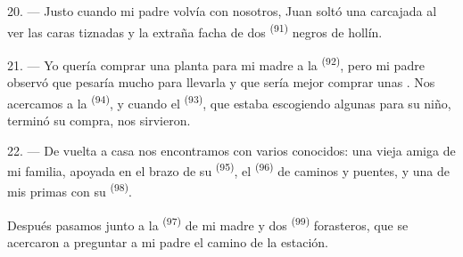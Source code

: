 20. --- Justo cuando mi padre volvía con nosotros, Juan soltó una carcajada
al ver las caras tiznadas y la extraña facha de dos
 \textsuperscript{(91)} negros de hollín.

21. --- Yo quería comprar una planta para mi madre a la 
\textsuperscript{(92)}, pero mi padre observó que pesaría mucho para llevarla y que
sería mejor comprar unas . Nos acercamos a la
 \textsuperscript{(94)}, y cuando el 
\textsuperscript{(93)}, que estaba escogiendo algunas para su niño, terminó su
compra, nos sirvieron.

22. --- De vuelta a casa nos encontramos con varios conocidos: una vieja
amiga de mi familia, apoyada en el brazo de su 
\textsuperscript{(95)}, el  \textsuperscript{(96)} de caminos y puentes, y
una de mis primas con su  \textsuperscript{(98)}.

Después pasamos junto a la  \textsuperscript{(97)} de mi madre y dos
 \textsuperscript{(99)} forasteros, que se acercaron a preguntar a mi
padre el camino de la estación.
\VUsaut{6.0mm}
\VUfilet{22mm}
